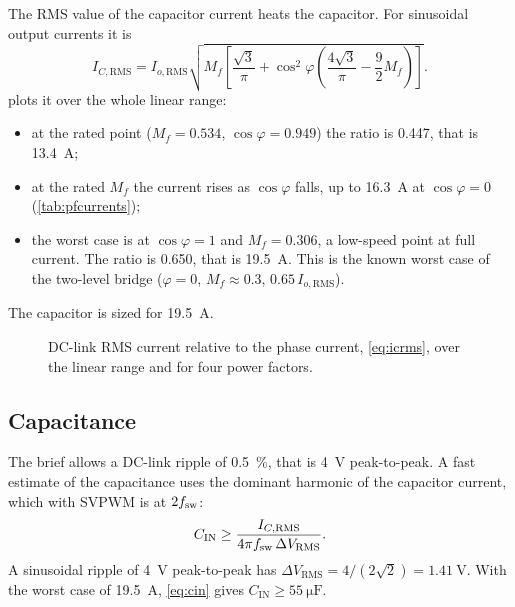 The RMS value of the capacitor current heats the capacitor. For sinusoidal output currents it is~\cite{kolar_dclink}
%
\begin{equation}
  I_{C,\mathrm{RMS}} = I_{o,\mathrm{RMS}}
  \sqrt{M_f\left[\frac{\sqrt{3}}{\pi}
    + \cos^2\!\varphi\left(\frac{4\sqrt{3}}{\pi}-\frac{9}{2}M_f\right)\right]} .
  \label{eq:icrms}
\end{equation}
%
 plots it over the whole linear range:
\begin{itemize}
  \item at the rated point ($M_f = 0.534$, $\cos\varphi = 0.949$) the ratio
        is 0.447, that is \SI{13.4}{\ampere};
  \item at the rated $M_f$ the current rises as $\cos\varphi$ falls, up to
        \SI{16.3}{\ampere} at $\cos\varphi = 0$ (\cref{tab:pfcurrents});
  \item the worst case is at $\cos\varphi = 1$ and $M_f = 0.306$, a low-speed
        point at full current. The ratio is 0.650, that is
        \SI{19.5}{\ampere}. This is the known worst case of the two-level bridge
        ($\varphi = 0$, $M_f \approx 0.3$, $0.65\,I_{o,\mathrm{RMS}}$).
\end{itemize}
The capacitor is sized for \SI{19.5}{\ampere}.

\begin{figure}[H]
\centering

\caption{DC-link RMS current relative to the phase current, \cref{eq:icrms},
over the linear range and for four power factors.}
\label{fig:kolar}
\end{figure}

\subsection{Capacitance}

The brief allows a DC-link ripple of \SI{0.5}{\percent}, that is
\SI{4}{\volt} peak-to-peak. A fast estimate of the capacitance uses the
dominant harmonic of the capacitor current, which with SVPWM is at
$2f_{\mathrm{sw}}$:
%
\begin{equation}
  C_\mathrm{IN} \geq \frac{I_{C,\mathrm{RMS}}}{4\pi f_{\mathrm{sw}}\, \Delta V_\mathrm{RMS}} .
  \label{eq:cin}
\end{equation}
%
A sinusoidal ripple of \SI{4}{\volt} peak-to-peak has
$\Delta V_\mathrm{RMS} = 4/(2\sqrt{2}) = \SI{1.41}{\volt}$. With the worst
case of \SI{19.5}{\ampere}, \cref{eq:cin} gives
$C_\mathrm{IN} \geq \SI{55}{\micro\farad}$.

